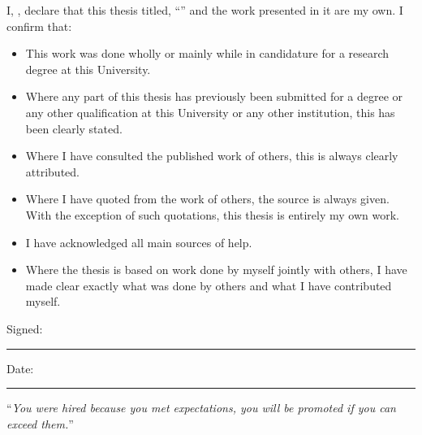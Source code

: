 \documentclass[
11pt, %
oneside, %
english, %
singlespacing, %
headsepline, %
]{MastersDoctoralThesis} %
\theoremstyle{assumption}
\theoremstyle{definition}
\theoremstyle{proposition}
\begin{document}

\begin{declaration}
\addchaptertocentry{\authorshipname} %
\noindent I, \authorname, declare that this thesis titled, \enquote{\ttitle} and the work presented in it are my own. I confirm that:

\begin{itemize} 
\item This work was done wholly or mainly while in candidature for a research degree at this University.
\item Where any part of this thesis has previously been submitted for a degree or any other qualification at this University or any other institution, this has been clearly stated.
\item Where I have consulted the published work of others, this is always clearly attributed.
\item Where I have quoted from the work of others, the source is always given. With the exception of such quotations, this thesis is entirely my own work.
\item I have acknowledged all main sources of help.
\item Where the thesis is based on work done by myself jointly with others, I have made clear exactly what was done by others and what I have contributed myself.\\
\end{itemize}
 
\noindent Signed:\\
\rule[0.5em]{25em}{0.5pt} %
 
\noindent Date:\\
\rule[0.5em]{25em}{0.5pt} %
\end{declaration}

\cleardoublepage


\vspace*{0.2\textheight}

\noindent\enquote{\itshape You were hired because you met expectations, you will be promoted if you can exceed them.}\bigbreak
\end{document}
